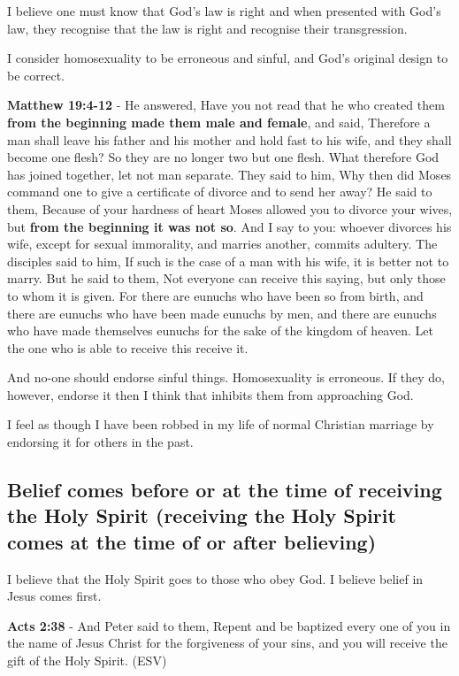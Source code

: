 \documentclass[11pt]{article}
\begin{document}
I believe one must know that God's law is
right and when presented with God's law, they
recognise that the law is right and recognise
their transgression.

I consider homosexuality to be erroneous and sinful, and God's original design to be correct.

\textbf{Matthew 19:4-12} - He answered, Have you not read that he who created them \textbf{from the beginning made them male and female}, and said, Therefore a man shall leave his father and his mother and hold fast to his wife, and they shall become one flesh?  So they are no longer two but one flesh. What therefore God has joined together, let not man separate.  They said to him, Why then did Moses command one to give a certificate of divorce and to send her away?  He said to them, Because of your hardness of heart Moses allowed you to divorce your wives, but \textbf{from the beginning it was not so}.  And I say to you: whoever divorces his wife, except for sexual immorality, and marries another, commits adultery.  The disciples said to him, If such is the case of a man with his wife, it is better not to marry.  But he said to them, Not everyone can receive this saying, but only those to whom it is given.  For there are eunuchs who have been so from birth, and there are eunuchs who have been made eunuchs by men, and there are eunuchs who have made themselves eunuchs for the sake of the kingdom of heaven. Let the one who is able to receive this receive it.

And no-one should endorse sinful things. Homosexuality is erroneous.
If they do, however, endorse it then I think that inhibits them from approaching God.

I feel as though I have been robbed in my life of normal Christian marriage by endorsing it for others in the past.

\subsection{Belief comes before or at the time of receiving the Holy Spirit (receiving the Holy Spirit comes at the time of or after believing)}
\label{sec:org4c64226}
I believe that the Holy Spirit goes to those who obey God. I believe belief in Jesus comes first.

\textbf{Acts 2:38} - And Peter said to them, Repent and be baptized every one of you in the name of Jesus Christ for the forgiveness of your sins, and you will receive the gift of the Holy Spirit. (ESV)
\end{document}
